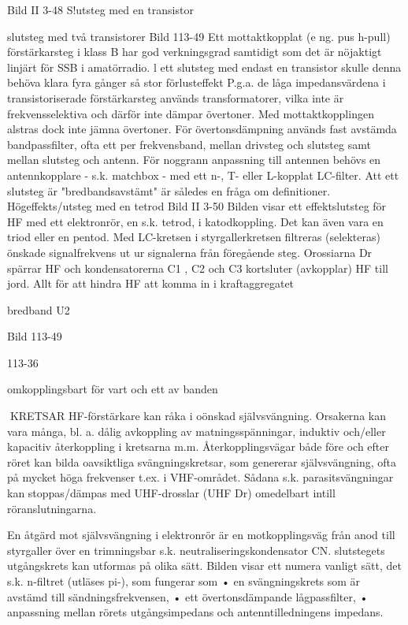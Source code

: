 \documentclass[a4paper,twoside,twocolumn,openright]{book}
\begin{document}
{{{{{{Bild II 3-48 S!utsteg med en transistor

slutsteg med två transistorer
Bild 113-49
Ett mottaktkopplat (e ng. pus h-pull) förstärkarsteg i klass B har god verkningsgrad
samtidigt som det är nöjaktigt linjärt för SSB
i amatörradio. l ett slutsteg med endast en
transistor skulle denna behöva klara fyra
gånger så stor förlusteffekt
P.g.a. de låga impedansvärdena i transistoriserade förstärkarsteg används transformatorer, vilka inte är frekvensselektiva
och därför inte dämpar övertoner. Med mottaktkopplingen alstras dock inte jämna övertoner. För övertonsdämpning används fast
avstämda bandpassfilter, ofta ett per frekvensband, mellan drivsteg och slutsteg samt
mellan slutsteg och antenn.
För noggrann anpassning till antennen
behövs en antennkopplare - s.k. matchbox
- med ett n-, T- eller L-kopplat LC-filter.
Att ett slutsteg är "bredbandsavstämt" är
således en fråga om definitioner.
Högeffekts/utsteg med en tetrod
Bild II 3-50
Bilden visar ett effektslutsteg för HF med ett
elektronrör, en s.k. tetrod, i katodkoppling.
Det kan även vara en triod eller en pentod.
Med LC-kretsen i styrgallerkretsen filtreras (selekteras) önskade signalfrekvens ut
ur signalerna från föregående steg.
Orossiarna Dr spärrar HF och kondensatorerna C1 , C2 och C3 kortsluter (avkopplar)
HF till jord. Allt för att hindra HF att komma in
i kraftaggregatet

bredband
U2

Bild 113-49

113-36

omkopplingsbart för
vart och ett av banden

KRETSAR
HF-förstärkare kan råka i oönskad självsvängning. Orsakerna kan vara många, bl. a.
dålig avkoppling av matningsspänningar, induktiv och/eller kapacitiv återkoppling i kretsarna m.m.
Återkopplingsvägar både före och efter
röret kan bilda oavsiktliga svängningskretsar, som genererar självsvängning, ofta på
mycket höga frekvenser t.ex. i VHF-området. Sådana s.k. parasitsvängningar kan
stoppas/dämpas med UHF-drosslar (UHF
Dr) omedelbart intill röranslutningarna.

En åtgärd mot självsvängning i elektronrör är en motkopplingsväg från anod till styrgaller över en trimningsbar s.k. neutraliseringskondensator CN.
slutstegets utgångskrets kan utformas
på olika sätt. Bilden visar ett numera vanligt
sätt, det s.k. n-filtret (utläses pi-), som fungerar som
• en svängningskrets som är avstämd till
sändningsfrekvensen,
• ett övertonsdämpande lågpassfilter,
• anpassning mellan rörets utgångsimpedans och antenntilledningens impedans.

}}}}}}
\end{document}
